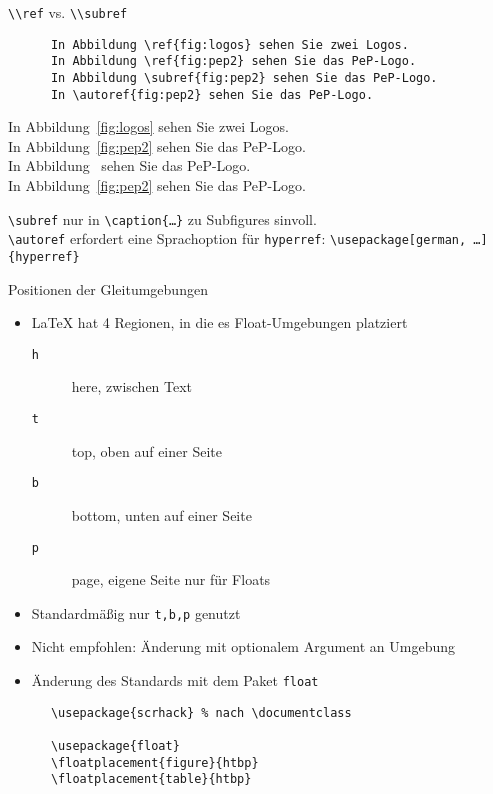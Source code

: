 \begin{frame}[fragile]{\lstinline+\\ref+ vs. \lstinline+\\subref+}
  \begin{CodeExample}{0.47}
    \begin{lstlisting}
      In Abbildung \ref{fig:logos} sehen Sie zwei Logos.
      In Abbildung \ref{fig:pep2} sehen Sie das PeP-Logo.
      In Abbildung \subref{fig:pep2} sehen Sie das PeP-Logo.
      In \autoref{fig:pep2} sehen Sie das PeP-Logo.
    \end{lstlisting}
    \CodeResult
      \strut
      In Abbildung~\ref{fig:logos} sehen Sie zwei Logos. \\[\baselineskip]
      In Abbildung~\ref{fig:pep2} sehen Sie das PeP-Logo. \\[\baselineskip]
      In Abbildung~ sehen Sie das PeP-Logo.\\[\baselineskip]
      In Abbildung~\ref{fig:pep2} sehen Sie das PeP-Logo.
  \end{CodeExample}
  \vspace{2em}
  \lstinline+\subref+ nur in \lstinline+\caption{…}+ zu Subfigures sinvoll. \\
  \lstinline+\autoref+ erfordert eine Sprachoption für \lstinline+hyperref+: \lstinline+\usepackage[german, …]{hyperref}+  \\
\end{frame}

\begin{frame}[fragile]{Positionen der Gleitumgebungen}
  \begin{itemize}
    \item \LaTeX{} hat 4 Regionen, in die es Float-Umgebungen platziert
      \begin{description}
        \item[\texttt{h}] here, zwischen Text
        \item[\texttt{t}] top, oben auf einer Seite
        \item[\texttt{b}] bottom, unten auf einer Seite
        \item[\texttt{p}] page, eigene Seite nur für Floats
      \end{description}
    \item Standardmäßig nur \texttt{t,b,p} genutzt
    \item \alert{Nicht} empfohlen: Änderung mit optionalem Argument an Umgebung
    \item Änderung des Standards mit dem Paket \texttt{float}
  \end{itemize}

  \begin{Packages}
    \begin{lstlisting}
      \usepackage{scrhack} % nach \documentclass

      \usepackage{float}
      \floatplacement{figure}{htbp}
      \floatplacement{table}{htbp}
    \end{lstlisting}
  \end{Packages}
\end{frame}
